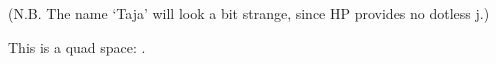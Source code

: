 



\table
\vfill\eject

\text
\punct
\names

(N.B. The name `Taja' will look a bit strange, since HP provides no dotless j.)

This is a quad space: \vrule\quad\vrule.

\bye
